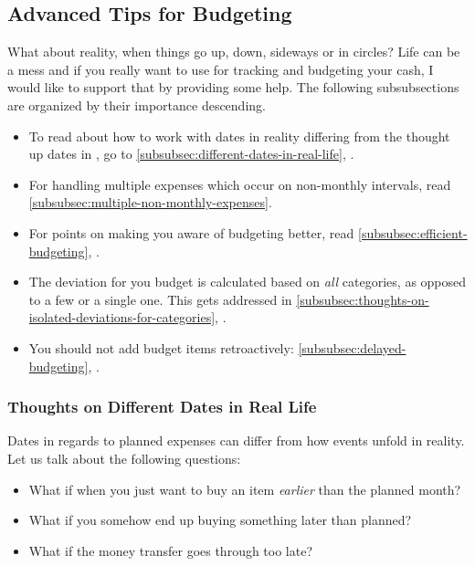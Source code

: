 \subsection{Advanced Tips for Budgeting}
\label{subsec:advanced-tips-for-budgeting}

What about reality, when things go up, down, sideways or in circles?
Life can be a mess and if you really want to use \tfn for tracking and budgeting your cash, I would like to support that by providing some help.
The following subsubsections are organized by their importance descending.
\begin{itemize}
	\item To read about how to work with dates in reality differing from the thought up dates in \tfn, go to \autoref{subsubsec:different-dates-in-real-life}, .
	\item For handling multiple expenses which occur on non-monthly intervals, read \autoref{subsubsec:multiple-non-monthly-expenses}.
	\item For points on making you aware of budgeting better, read \autoref{subsubsec:efficient-budgeting}, .
	\item The deviation for you budget is calculated based on \emph{all} categories, as opposed to a few or a single one.
	This gets addressed in \autoref{subsubsec:thoughts-on-isolated-deviations-for-categories}, .
	\item You should not add budget items retroactively: 	\autoref{subsubsec:delayed-budgeting}, .
\end{itemize}

\subsubsection{Thoughts on Different Dates in Real Life}
\label{subsubsec:different-dates-in-real-life}

Dates in regards to planned expenses can differ from how events unfold in reality.
Let us talk about the following questions:
\begin{itemize}
	\item What if when you just want to buy an item \emph{earlier} than the planned month?
	\item What if you somehow end up buying something later than planned?
	\item What if the money transfer goes through too late?
\end{itemize}

